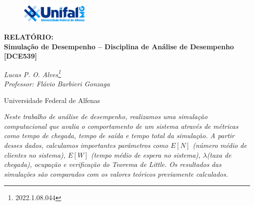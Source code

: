 \begin{center}
\begin{figure}[H]
    \centering
    \includegraphics[width=0.3\textwidth]{Imagens/logo.png}
\end{figure}

\textbf{\Large RELATÓRIO: \\ Simulação de Desempenho – Disciplina de Análise de Desempenho [DCE539] }
\end{center}

\begin{center}
\textit{
    Lucas P. O. Alves\footnote{2022.1.08.044}\\
    Professor: Flávio Barbieri Gonzaga
}
\end{center}

\begin{center}
    Universidade Federal de Alfenas
\end{center}

\begin{center}
    \textit{Neste trabalho de análise de desempenho, realizamos uma simulação computacional que avalia o comportamento de um sistema através de métricas como tempo de chegada, tempo de saída e tempo total da simulação. A partir desses dados, calculamos importantes parâmetros como $E[N]$ (número médio de clientes no sistema), $E[W]$ (tempo médio de espera no sistema), $\lambda$(taxa de chegada), ocupação e verificação do Teorema de Little. Os resultados das simulações são comparados com os valores teóricos previamente calculados.}
\end{center}

